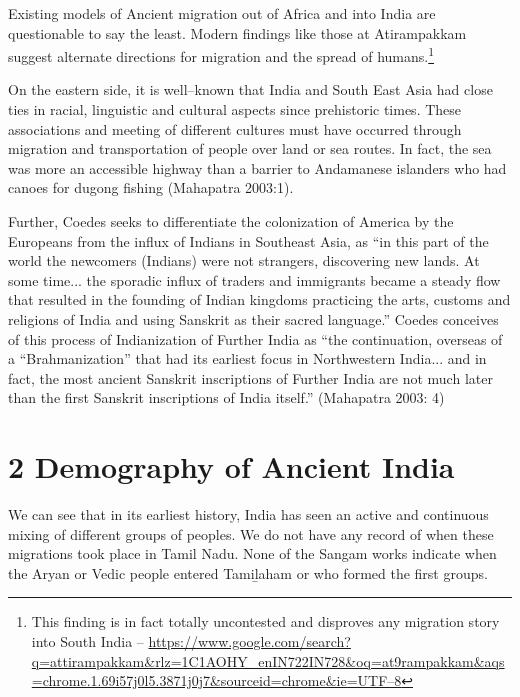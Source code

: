 \vskip 2pt

Existing models of Ancient migration out of Africa and into India are questionable to say the least. Modern findings like those at Atirampakkam suggest alternate directions for migration and the spread of humans.\footnote{This finding is in fact totally uncontested and disproves any migration story into South India – \url{https://www.google.com/search?q=attirampakkam&rlz=1C1AOHY_enIN722IN728&oq=at9rampakkam&aqs=chrome.1.69i57j0l5.3871j0j7&sourceid=chrome&ie=UTF–8}}

\vskip 2pt

On the eastern side, it is well–known that India and South East Asia had close ties in racial, linguistic and cultural aspects since prehistoric times. These associations and meeting of different cultures must have occurred through migration and transportation of people over land or sea routes. In fact, the sea was more an accessible highway than a barrier to Andamanese islanders who had canoes for dugong fishing (Mahapatra 2003:1).

\vskip 2pt

\begin{myquote}
Further, Coedes seeks to differentiate the colonization of America by the Europeans from the influx of Indians in Southeast Asia, as “in this part of the world the newcomers (Indians) were not strangers, discovering new lands. At some time... the sporadic influx of traders and immigrants became a steady flow that resulted in the founding of Indian kingdoms practicing the arts, customs and religions of India and using Sanskrit as their sacred language.” Coedes conceives of this process of Indianization of Further India as “the continuation, overseas of a “Brahmanization” that had its earliest focus in Northwestern India... and in fact, the most ancient Sanskrit inscriptions of Further India are not much later than the first Sanskrit inscriptions of India itself.” (Mahapatra 2003: 4)
\end{myquote}


\section*{2 Demography of Ancient India}

We can see that in its earliest history, India has seen an active and continuous mixing of different groups of peoples. We do not have any record of when these migrations took place in Tamil Nadu. None of the Sangam works indicate when the Aryan or Vedic people entered Tamiḻaham or who formed the first groups.

